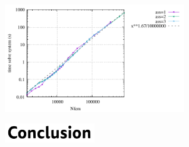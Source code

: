\begin{center}
\includegraphics[width=8cm]{python_codes/fieldstone_181/RESULTS/times_solve.pdf}
\end{center}


\includegraphics[width=4cm]{./images/conclusion.png}


